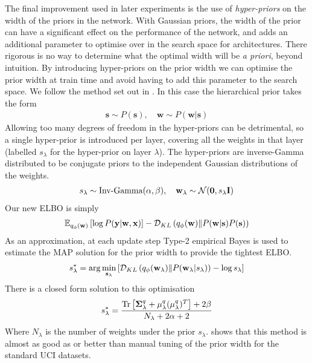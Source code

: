 The final improvement used in later experiments is the use of \textit{hyper-priors} on the width of the priors in the network. With Gaussian priors, the width of the prior can have a significant effect on the performance of the network, and adds an additional parameter to optimise over in the search space for architectures. There rigorous is no way to determine what the optimal width will be \textit{a priori}, beyond intuition. By introducing hyper-priors on the prior width we can optimise the prior width at train time and avoid having to add this parameter to the search space. We follow the method set out in \citet{wu2018fixing}. In this case the hierarchical prior takes the form 
\begin{align}
	\mathbf{s} \sim P(\mathbf{s}), \quad \mathbf{w} \sim P(\mathbf{w}| \mathbf{s})
\end{align}
Allowing too many degrees of freedom in the hyper-priors can be detrimental, so a single hyper-prior is introduced per layer, covering all the weights in that layer (labelled \( s_\lambda \) for the hyper-prior on layer \( \lambda \)). The hyper-priors are inverse-Gamma distributed to be conjugate priors to the independent Gaussian distributions of the weights.
\begin{align}
	s_\lambda \sim \operatorname{Inv-Gamma}(\alpha, \beta), \quad \mathbf{w}_\lambda \sim \mathcal{N}(\mathbf{0}, s_\lambda\mathbf{I}) 
\end{align}
Our new ELBO is simply
\begin{align}
\mathbb{E}_{q_\phi(\mathbf{w})}\left[ \log P(\mathbf{y} |  \mathbf{w}, \mathbf{x}) \right] - \mathcal{D}_{KL} \left( q_\phi(\mathbf{w}) \| P(\mathbf{w}| \mathbf{s})P(\mathbf{s}) \right)
\end{align}
As an approximation, at each update step Type-2 empirical Bayes is used to estimate the MAP solution for the prior width to provide the tightest ELBO.
\begin{align}
	s^*_\lambda = \arg\min_{\mathbf{s}_\lambda} \left[ \mathcal{D}_{KL} \left( q_\phi(\mathbf{w}_\lambda) \| P(\mathbf{w}_\lambda| s_\lambda) \right) - \log s_\lambda  \right]
\end{align} 
There is a closed form solution to this optimisation
\begin{align}
	s^*_\lambda = \frac{\operatorname{Tr} \left[ \mathbf{\Sigma}^q_\lambda+ \mathbf{\mu}^q_\lambda (\mathbf{\mu}^q_\lambda)^T \right] + 2\beta}{N_\lambda + 2 \alpha + 2}
\end{align}
Where  \( N_\lambda \) is the number of weights under the prior \( s_\lambda \). \citep{wu2018fixing} shows that this method is almost as good as or better than manual tuning of the prior width for the standard UCI datasets.

